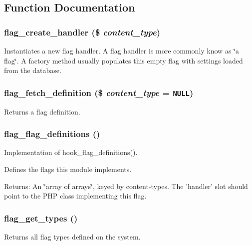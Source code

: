 \subsection{Function Documentation}
\hypertarget{flag_8inc_0e5203bf1b4aeac5a5a59ee9916f90f0}{
\subsubsection[{flag\_\-create\_\-handler}]{\setlength{\rightskip}{0pt plus 5cm}flag\_\-create\_\-handler (\$ {\em content\_\-type})}}
\label{flag_8inc_0e5203bf1b4aeac5a5a59ee9916f90f0}


Instantiates a new flag handler. A flag handler is more commonly know as \char`\"{}a flag\char`\"{}. A factory method usually populates this empty flag with settings loaded from the database. \hypertarget{flag_8inc_de183158b0c6693a4ddd93443524813a}{
\subsubsection[{flag\_\-fetch\_\-definition}]{\setlength{\rightskip}{0pt plus 5cm}flag\_\-fetch\_\-definition (\$ {\em content\_\-type} = {\tt NULL})}}
\label{flag_8inc_de183158b0c6693a4ddd93443524813a}


Returns a flag definition. \hypertarget{flag_8inc_7dca6c37b1fef3d06a063a2e3b0105d9}{
\subsubsection[{flag\_\-flag\_\-definitions}]{\setlength{\rightskip}{0pt plus 5cm}flag\_\-flag\_\-definitions ()}}
\label{flag_8inc_7dca6c37b1fef3d06a063a2e3b0105d9}


Implementation of hook\_\-flag\_\-definitions().

Defines the flags this module implements.

\begin{Desc}
\item[Returns:]An \char`\"{}array of arrays\char`\"{}, keyed by content-types. The 'handler' slot should point to the PHP class implementing this flag. \end{Desc}
\hypertarget{flag_8inc_9c51bca58c6862b4c48420cadc932265}{
\subsubsection[{flag\_\-get\_\-types}]{\setlength{\rightskip}{0pt plus 5cm}flag\_\-get\_\-types ()}}
\label{flag_8inc_9c51bca58c6862b4c48420cadc932265}


Returns all flag types defined on the system. 